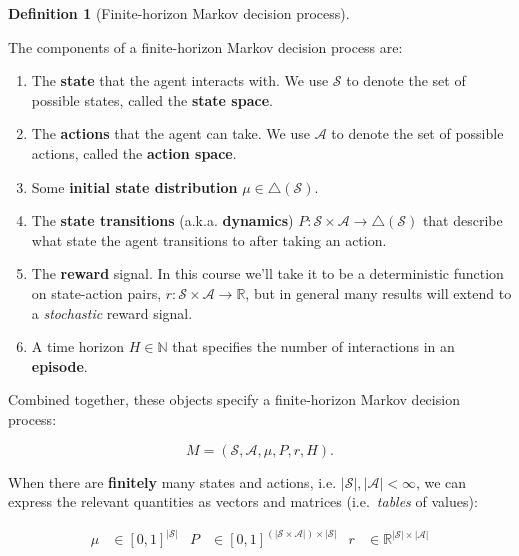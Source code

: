 \documentclass[
  letterpaper,
  DIV=11,
  numbers=noendperiod]{scrreprt}
\theoremstyle{plain}
\theoremstyle{plain}
\theoremstyle{definition}
\theoremstyle{definition}
\newtheorem{definition}{Definition}[chapter]
\theoremstyle{remark}
\begin{document}
\begin{definition}[Finite-horizon Markov decision
process]\protect\hypertarget{def-finite_horizon_mdp}{}\label{def-finite_horizon_mdp}

The components of a finite-horizon Markov decision process are:

\begin{enumerate}
\def\labelenumi{\arabic{enumi}.}
\item
  The \textbf{state} that the agent interacts with. We use
  \(\mathcal{S}\) to denote the set of possible states, called the
  \textbf{state space}.
\item
  The \textbf{actions} that the agent can take. We use \(\mathcal{A}\)
  to denote the set of possible actions, called the \textbf{action
  space}.
\item
  Some \textbf{initial state distribution}
  \(\mu \in \triangle(\mathcal{S})\).
\item
  The \textbf{state transitions} (a.k.a. \textbf{dynamics})
  \(P : \mathcal{S} \times \mathcal{A} \to \triangle(\mathcal{S})\) that
  describe what state the agent transitions to after taking an action.
\item
  The \textbf{reward} signal. In this course we'll take it to be a
  deterministic function on state-action pairs,
  \(r : \mathcal{S} \times \mathcal{A} \to \mathbb{R}\), but in general
  many results will extend to a \emph{stochastic} reward signal.
\item
  A time horizon \(H\in \mathbb{N}\) that specifies the number of
  interactions in an \textbf{episode}.
\end{enumerate}

Combined together, these objects specify a finite-horizon Markov
decision process:

\[M = (\mathcal{S}, \mathcal{A}, \mu, P, r, H).\]

When there are \textbf{finitely} many states and actions, i.e.
\(|\mathcal{S}|, |\mathcal{A}| < \infty\), we can express the relevant
quantities as vectors and matrices (i.e.~\emph{tables} of values):

\[
\begin{aligned}
    \mu &\in [0, 1]^{|\mathcal{S}|} &
    P &\in [0, 1]^{(|\mathcal{S} \times \mathcal{A}|) \times |\mathcal{S}|} &
    r &\in \mathbb{R}^{|\mathcal{S}| \times |\mathcal{A}|}
\end{aligned}
\]

\end{definition}
\end{document}
